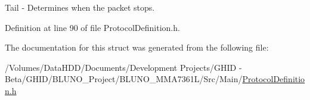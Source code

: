 \-Tail -\/ \-Determines when the packet stops. 



\-Definition at line 90 of file \-Protocol\-Definition.\-h.



\-The documentation for this struct was generated from the following file\-:\begin{DoxyCompactItemize}
\item 
/\-Volumes/\-Data\-H\-D\-D/\-Documents/\-Development Projects/\-G\-H\-I\-D -\/ Beta/\-G\-H\-I\-D/\-B\-L\-U\-N\-O\-\_\-\-Project/\-B\-L\-U\-N\-O\-\_\-\-M\-M\-A7361\-L/\-Src/\-Main/\hyperlink{_protocol_definition_8h}{\-Protocol\-Definition.\-h}\end{DoxyCompactItemize}
